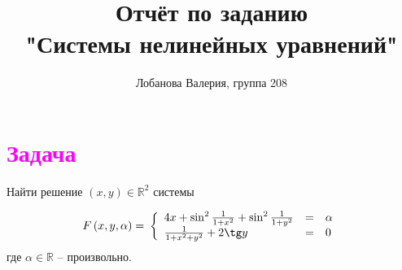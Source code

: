 \documentclass[a4paper,12pt]{article}
\title{\textbf{Отчёт по заданию \\ "Системы нелинейных уравнений"}}
\author{Лобанова Валерия, группа 208}
\date{ }
\begin{document}
\maketitle
\thispagestyle{empty} 
\newpage
\tableofcontents{}





\newpage
\section{\textcolor{Fuchsia}{Задача}}
\par\bigskip
Найти решение $ (x,y) \in \mathbb{R}^2$ системы

\begin{equation}
    \label{eq:syst1}
    \text{$ F\,(x, y, \alpha) = $ }
    \left\{
        \begin{array}{lcl} 
            4x + \sin^2 \frac{1}{1+x^2} + \sin^2 \frac{1}{1+y^2}& = &\alpha \\ 
            \frac{1}{1+x^2+y^2} + 2 \tg y & = &0 \\ 
        \end{array} 
    \right. 
\end{equation} 
где $ \alpha \in \mathbb{R} $ -- произвольно.



\end{document}

